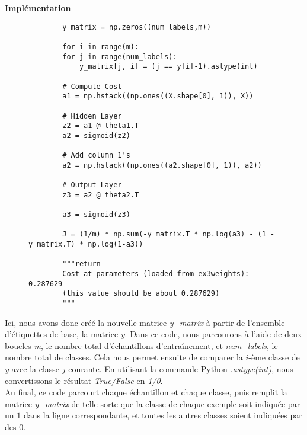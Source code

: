 \clearpage

\noindent
\textbf{Implémentation}

    \begin{figure}[!h]
        \begin{verbatim}
        y_matrix = np.zeros((num_labels,m)) 
    
        for i in range(m):
        for j in range(num_labels):
            y_matrix[j, i] = (j == y[i]-1).astype(int)
            
        # Compute Cost
        a1 = np.hstack((np.ones((X.shape[0], 1)), X))

        # Hidden Layer
        z2 = a1 @ theta1.T
        a2 = sigmoid(z2)
    
        # Add column 1's 
        a2 = np.hstack((np.ones((a2.shape[0], 1)), a2))

        # Output Layer
        z3 = a2 @ theta2.T

        a3 = sigmoid(z3) 

        J = (1/m) * np.sum(-y_matrix.T * np.log(a3) - (1 - y_matrix.T) * np.log(1-a3))
    
        """return 
        Cost at parameters (loaded from ex3weights): 0.287629 
        (this value should be about 0.287629)       
        """
        \end{verbatim}   
        \end{figure}

Ici, nous avons donc créé la nouvelle matrice \textit{y\_matrix} à partir de l'ensemble d'étiquettes de base, 
la matrice \textit{y}. Dans ce code, nous parcourons à l'aide de deux boucles \textit{m}, le nombre total 
d'échantillons d'entraînement, et \textit{num\_labels}, le nombre total de classes. Cela nous permet ensuite
de comparer la \(i\)-ème classe de \textit{y} avec la classe \(j\) courante. En utilisant la commande Python
\textit{.astype(int)}, nous convertissons le résultat \textit{True/False} en \textit{1/0}. \\
Au final, ce code parcourt chaque échantillon et chaque classe, puis remplit la matrice \textit{y\_matrix} de telle sorte que la classe
de chaque exemple soit indiquée par un \(1\) dans la ligne correspondante, et toutes les autres classes soient 
indiquées par des \(0\). \\

